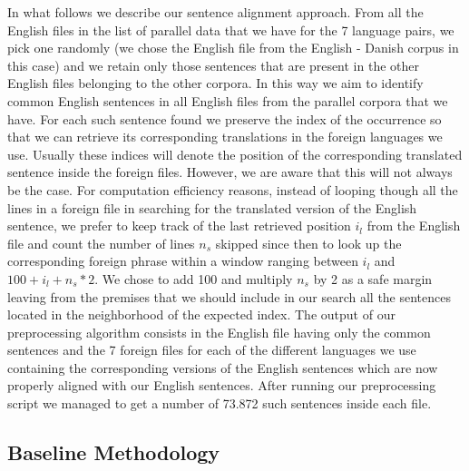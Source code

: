\documentclass[11pt]{article}
\begin{document}
In what follows we describe our sentence alignment approach. From all the English files in the list of parallel data that we have for the 7 language pairs, we pick one randomly (we chose the English file from the English - Danish corpus in this case) and we retain only those sentences that are present in the other English files belonging to the other corpora. In this way we aim to identify common English sentences in all English files from the parallel corpora that we have. For each such sentence found we preserve the index of the occurrence so that we can retrieve its corresponding translations in the foreign languages we use. Usually these indices will denote the position of the corresponding translated sentence inside the foreign files. However, we are aware that this will not always be the case. For computation efficiency reasons, instead of looping though all the lines in a foreign file in searching for the translated version of the English sentence, we prefer to keep track of the last retrieved position $i_l$ from the English file and count the number of lines $n_s$ skipped since then to look up the corresponding foreign phrase within a window ranging between $i_l$ and $100 + i_l + n_s*2$. We chose to add 100 and multiply $n_s$ by 2 as a safe margin leaving from the premises that we should include in our search all the sentences located in the neighborhood of the expected index. 
The output of our preprocessing algorithm consists in the English file having only the common sentences and the 7 foreign files for each of the different languages we use containing the corresponding versions of the English sentences which are now properly aligned with our English sentences. After running our preprocessing script we managed to get a number of 73.872 such sentences inside each file.


\subsection{Baseline Methodology}
\end{document}
